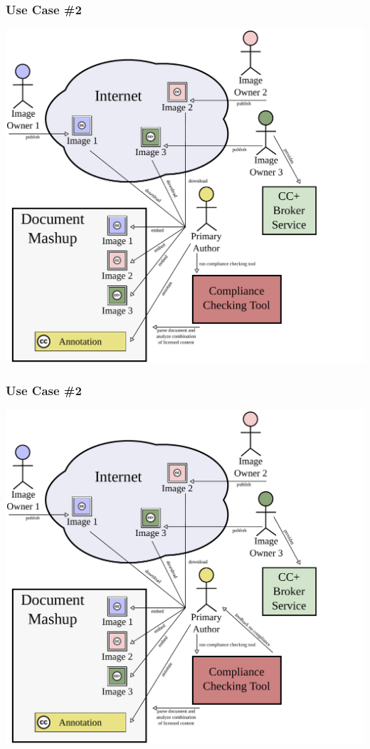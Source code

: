 \documentclass[mathserif,xcolor=dvipsnames,hyperref={bookmarks=true}]{beamer}
\begin{document}
    \begin{frame}[t]
        \frametitle{Use Case \#2}
        \begin{center}
            \includegraphics[width=0.9\textheight]{../resources/usecases/usecase2/usecase2-step28.pdf}
        \end{center}
    \end{frame}
    \begin{frame}[t]
        \frametitle{Use Case \#2}
        \begin{center}
            \includegraphics[width=0.9\textheight]{../resources/usecases/usecase2/usecase2-step29.pdf}
        \end{center}
    \end{frame}
\end{document}
